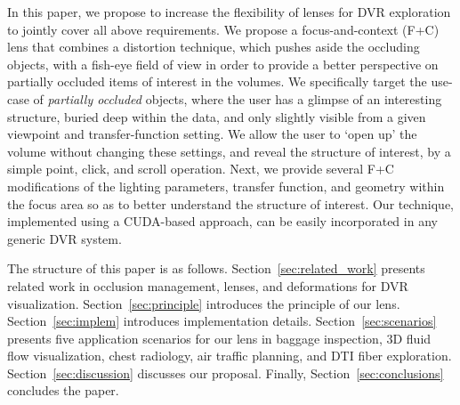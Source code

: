 In this paper, we propose to increase the flexibility of lenses for DVR exploration to jointly cover all above requirements. We propose a focus-and-context (F+C) lens that combines a distortion technique, which pushes aside the occluding objects, with a fish-eye field of view in order to provide a better perspective on partially occluded items of interest in the volumes. We specifically target the use-case of \emph{partially occluded} objects, where the user has a glimpse of an interesting structure, buried deep within the data, and only slightly visible from a given viewpoint and transfer-function setting. We allow the user to `open up' the volume without changing these settings, and reveal the structure of interest, by a simple point, click, and scroll operation. Next, we provide several F+C modifications of the lighting parameters, transfer function, and geometry within the focus area so as to better understand the structure of interest. Our technique, implemented using a CUDA-based approach, can be easily incorporated in any generic DVR system.
 


The structure of this paper is as follows. Section~\ref{sec:related_work} presents related work in occlusion management, lenses, and deformations for DVR visualization. Section~\ref{sec:principle} introduces the principle of our lens. Section~\ref{sec:implem} introduces implementation details. Section~\ref{sec:scenarios} presents five application scenarios for our lens in baggage inspection, 3D fluid flow visualization, chest radiology, air traffic planning, and DTI fiber exploration. Section~\ref{sec:discussion} discusses our proposal. Finally, Section~\ref{sec:conclusions} concludes the paper.


